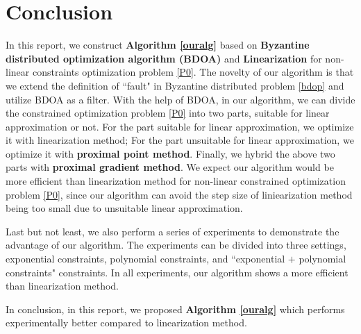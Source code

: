 \documentclass[conference]{IEEEtran}
\begin{document}
\section{Conclusion}
In this report, we construct \textbf{Algorithm \ref{ouralg}} based on \textbf{Byzantine distributed optimization algorithm (BDOA)} \cite{liu2021approximate} and \textbf{Linearization}\cite{wilson2012linearization} for non-linear constraints optimization problem \eqref{P0}. 
The novelty of our algorithm is that we extend the definition of ``fault" in Byzantine distributed problem \eqref{bdop} and utilize BDOA as a filter. With the help of BDOA, in our algorithm, we can divide the constrained optimization problem \eqref{P0} into two parts, suitable for linear approximation or not. For the part suitable for linear approximation, we optimize it with linearization method; For the part unsuitable for linear approximation, we optimize it with \textbf{proximal point method}\cite{ppm}. Finally, we hybrid the above two parts with \textbf{proximal gradient method}\cite{pgm}. We expect our algorithm would be more efficient than linearization method for non-linear constrained optimization problem \eqref{P0}, since our algorithm can avoid the step size of liniearization method being too small due to unsuitable linear approximation.

Last but not least, we also perform a series of experiments to demonstrate the advantage of our algorithm. The experiments can be divided into three settings, exponential constraints, polynomial constraints, and ``exponential $+$ polynomial constraints" constraints. In all experiments, our algorithm shows a more efficient than linearization method.

In conclusion, in this report, we proposed \textbf{Algorithm \ref{ouralg}} which performs experimentally better compared to linearization method.

\end{document}
